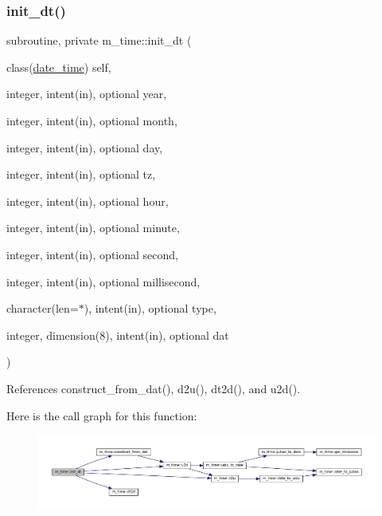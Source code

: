 \subsubsection{\texorpdfstring{init\+\_\+dt()}{init\_dt()}}
{\footnotesize\ttfamily subroutine, private m\+\_\+time\+::init\+\_\+dt (\begin{DoxyParamCaption}\item[{class(\mbox{\hyperlink{structm__time_1_1date__time}{date\+\_\+time}})}]{self,  }\item[{integer, intent(in), optional}]{year,  }\item[{integer, intent(in), optional}]{month,  }\item[{integer, intent(in), optional}]{day,  }\item[{integer, intent(in), optional}]{tz,  }\item[{integer, intent(in), optional}]{hour,  }\item[{integer, intent(in), optional}]{minute,  }\item[{integer, intent(in), optional}]{second,  }\item[{integer, intent(in), optional}]{millisecond,  }\item[{character(len=$\ast$), intent(in), optional}]{type,  }\item[{integer, dimension(8), intent(in), optional}]{dat }\end{DoxyParamCaption})\hspace{0.3cm}{\ttfamily [private]}}



References construct\+\_\+from\+\_\+dat(), d2u(), dt2d(), and u2d().

Here is the call graph for this function\+:\nopagebreak
\begin{figure}[H]
\begin{center}
\leavevmode
\includegraphics[width=350pt]{namespacem__time_a72455f763954fae8ebc0f454033d82a8_cgraph}
\end{center}
\end{figure}
\mbox{\label{namespacem__time_a3ad5cad6df02c53e0429c3602a072e3c}} 
